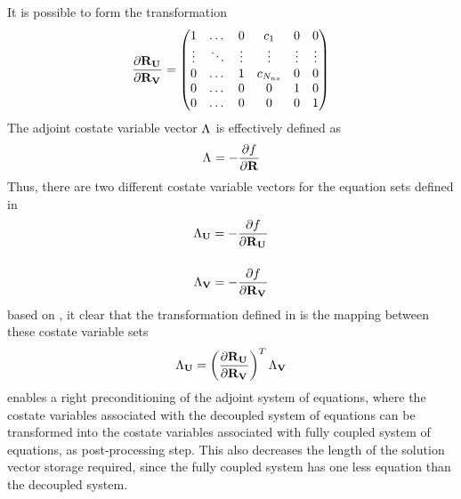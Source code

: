 It is possible to form the transformation
\begin{equation}
  \frac{\partial \mathbf R_{{\mathbf U}_{}}}{\partial \mathbf R_{{\mathbf V}_{}}} =
  \begin{pmatrix}
    1      & \dots  & 0 & c_1        & 0 & 0 \\
    \vdots & \ddots & \vdots            & \vdots & \vdots & \vdots \\
    0      & \dots  & 1 & c_{N_{ns}} & 0 & 0 \\
    0      & \dots  & 0 & 0          & 1 & 0 \\
    0      & \dots  & 0 & 0          & 0 & 1 \\
  \end{pmatrix}
  \label{drudrv}
\end{equation}
The adjoint costate variable vector $\Lambda_{}$ is effectively defined as
\begin{equation}
  \Lambda_{} = -\frac{\partial f}{\partial \mathbf R}
  \label{adj-lam-dfdr}
\end{equation}
Thus, there are two different costate variable vectors for the equation sets
defined in 
\begin{align}
  \Lambda_{\mathbf U} = -\frac{\partial f}{\partial \mathbf R_{{\mathbf U}_{}}}
  \label{adj-lam-ru} \\[12pt]
  \Lambda_{\mathbf V} = -\frac{\partial f}{\partial \mathbf R_{{\mathbf V}_{}}}
  \label{adj-lam-rv}
\end{align}
based on , it clear that the transformation
defined in  is the mapping between these costate variable sets
\begin{equation}
  \Lambda_{\mathbf U} = \left(\frac{\partial \mathbf R_{{\mathbf U}_{}}}{\partial \mathbf R_{{\mathbf V}_{}}} \right)^{T} \Lambda_{\mathbf V}
  \label{adj-ru-to-rv}
\end{equation}
 enables a right preconditioning of the adjoint system of
equations, where the costate variables associated with the decoupled system of
equations can be transformed into the costate variables associated with fully
coupled system of equations, as post-processing step.  This also decreases the
length of the solution vector storage required, since the fully coupled system
has one less equation than the decoupled system.

